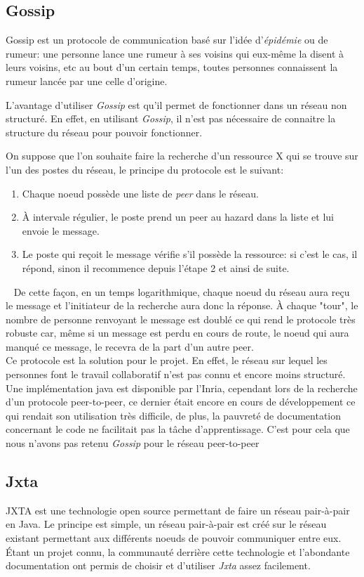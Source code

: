 	\subsection{Gossip}
	
		Gossip est un protocole de communication basé sur l'idée
		d'\emph{épidémie} ou de rumeur: une personne lance une rumeur à ses
		voisins qui eux-même la disent à leurs voisins, etc au bout d'un certain
		temps, toutes personnes connaissent la rumeur lancée par une celle
		d'origine.
		
		L'avantage d'utiliser \emph{Gossip} est qu'il permet de fonctionner dans
		un réseau non structuré. En effet, en utilisant \emph{Gossip}, il n'est
		pas nécessaire de connaitre la structure du réseau pour pouvoir
		fonctionner.
		
		On suppose que l'on souhaite faire la recherche d'un ressource X qui se
		trouve sur l'un des postes du réseau, le principe du protocole est le
		suivant:
		\begin{enumerate}
			\item Chaque noeud possède une liste de \emph{peer} dans le réseau.
			\item À intervale régulier, le poste prend un peer au hazard dans la
			liste et lui envoie le message.
			\item Le poste qui reçoit le message vérifie s'il possède la
			ressource: si c'est le cas, il répond, sinon il recommence depuis
			l'étape 2 et ainsi de suite.
		\end{enumerate}~
		De cette façon, en un temps logarithmique, chaque noeud du réseau aura
		reçu le message et l'initiateur de la recherche aura donc la réponse. À
		chaque "tour", le nombre de personne renvoyant le message est doublé ce
		qui rend le protocole très robuste car, même si un message est perdu en
		cours de route, le noeud qui aura manqué ce message, le recevra de la
		part d'un autre peer.\\
		
		Ce protocole est la solution pour le projet. En effet, le réseau sur
		lequel les personnes font le travail collaboratif n'est pas connu et
		encore moins structuré. Une implémentation java est disponible par
		l'Inria, cependant lors de la recherche d'un protocole peer-to-peer, ce
		dernier était encore en cours de développement ce qui rendait son
		utilisation très difficile, de plus, la pauvreté de documentation
		concernant le code ne facilitait pas la tâche d'apprentissage. C'est
		pour cela que nous n'avons pas retenu \emph{Gossip} pour le réseau
		peer-to-peer
	
	\subsection{Jxta}
		JXTA est une technologie open source permettant de faire un réseau
		pair-à-pair en Java. Le principe est simple, un réseau pair-à-pair est
		créé sur le réseau existant permettant aux différents noeuds de pouvoir
		communiquer entre eux.\\
		
		Étant un projet connu, la communauté derrière cette technologie et
		l'abondante documentation ont permis de choisir et d'utiliser
		\emph{Jxta} assez facilement.
